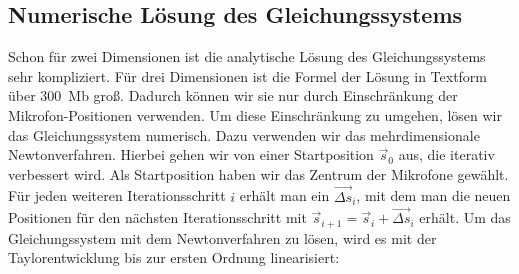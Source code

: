 \subsection{Numerische Lösung des Gleichungssystems}
Schon für zwei Dimensionen ist die analytische Lösung des Gleichungssystems sehr kompliziert. Für drei Dimensionen ist die Formel der Lösung in Textform über \num{300}~Mb groß. Dadurch können wir sie nur durch Einschränkung der Mikrofon-Positionen verwenden. Um diese Einschränkung zu umgehen, lösen wir das Gleichungssystem numerisch. Dazu verwenden wir das mehrdimensionale Newtonverfahren. Hierbei gehen wir von einer Startposition $\vec{s}_0$ aus, die iterativ verbessert wird. Als Startposition haben wir das Zentrum der Mikrofone gewählt.
Für jeden weiteren Iterationsschritt $i$ erhält man ein $\vec{\Delta{s}}_i$, mit dem man die neuen Positionen für den nächsten Iterationsschritt mit $\vec{s}_{i + 1} = \vec{s}_i + \vec{\Delta{s}}_i$ erhält.
Um das Gleichungssystem mit dem Newtonverfahren zu lösen, wird es mit der Taylorentwicklung bis zur ersten Ordnung linearisiert:
